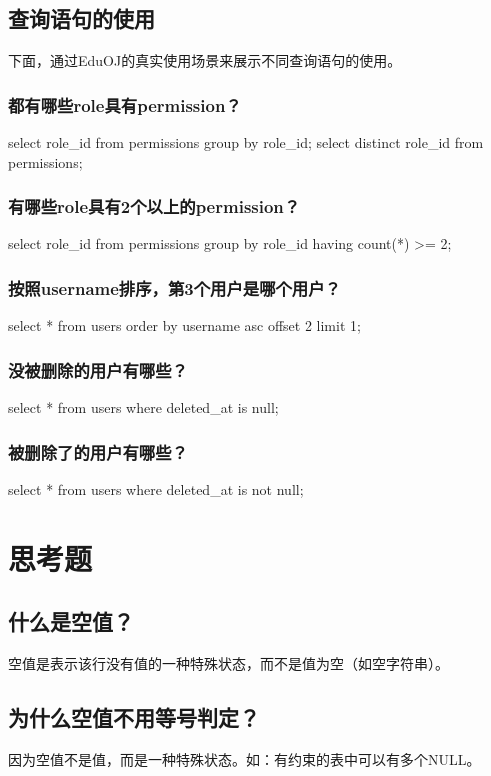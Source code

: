 \documentclass{ctexrep}
\begin{document}
\subsection{查询语句的使用}
下面，通过EduOJ的真实使用场景来展示不同查询语句的使用。
\subsubsection{都有哪些role具有permission？}
\begin{run}
    select role_id from permissions group by role_id;
    select distinct role_id from permissions;
\end{run}
\subsubsection{有哪些role具有2个以上的permission？}
\begin{run}
    select role_id from permissions group by role_id having count(*) >= 2;
\end{run}
\subsubsection{按照username排序，第3个用户是哪个用户？}
\begin{run}
    select * from users order by username asc offset 2 limit 1;
\end{run}
\subsubsection{没被删除的用户有哪些？}
\begin{run}
    select * from users where deleted_at is null;
\end{run}
\subsubsection{被删除了的用户有哪些？}
\begin{run}
    select * from users where deleted_at is not null;
\end{run}

\section{思考题}
\subsection*{什么是空值？}
空值是表示该行没有值的一种特殊状态，而不是值为空（如空字符串）。
\subsection*{为什么空值不用等号判定？}
因为空值不是值，而是一种特殊状态。如：有约束的表中可以有多个NULL。
\end{document}
